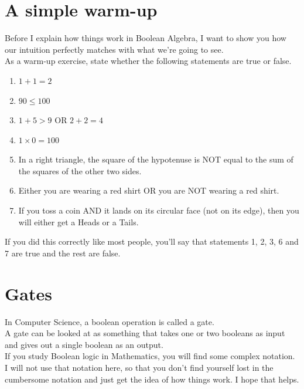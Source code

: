 \documentclass[letterpaper, 12pt]{book}
\begin{document}
\section{A simple warm-up}
Before I explain how things work in Boolean Algebra, I want to show you how our intuition perfectly matches with what we're going to see.\\
As a warm-up exercise, state whether the following statements are true or false.\\
\begin{enumerate}
	\item $1 + 1 = 2$
	\item $90 \le 100$
	\item $1 + 5 > 9$ OR $2 + 2 = 4$
	\item $1 \times 0 = 100$
	\item In a right triangle, the square of the hypotenuse is NOT equal to the sum of the squares of the other two sides.
	\item Either you are wearing a red shirt OR you are NOT wearing a red shirt.
	\item If you toss a coin AND it lands on its circular face (not on its edge), then you will either get a Heads or a Tails.
\end{enumerate}
If you did this correctly like most people, you'll say that statements 1, 2, 3, 6 and 7 are true and the rest are false.
\section{Gates}
In Computer Science, a boolean operation is called a gate.\\
A gate can be looked at as something that takes one or two booleans as input and gives out a single boolean as an output.\\
If you study Boolean logic in Mathematics, you will find some complex notation. I will not use that notation here, so that you don't find yourself lost in the cumbersome notation and just get the idea of how things work. I hope that helps.
\end{document}
